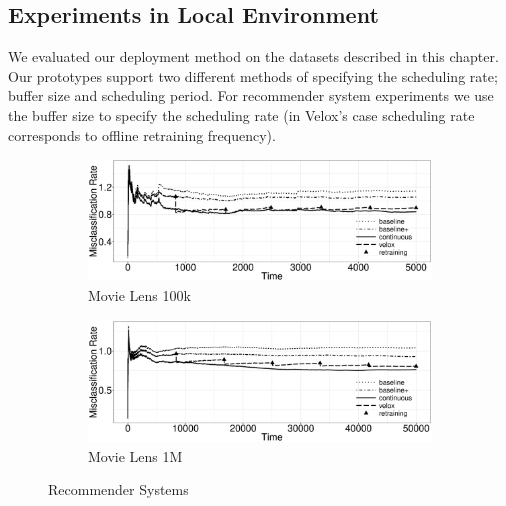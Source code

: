 \documentclass{vldb}
\begin{document}
\subsection{Experiments in Local Environment}
We evaluated our deployment method on the datasets described in this chapter.
Our prototypes support two different methods of specifying the scheduling rate; buffer size and scheduling period.
For recommender system experiments we use the buffer size to specify the scheduling rate (in Velox's case scheduling rate corresponds to offline retraining frequency).

\begin{figure}[h]
\begin{subfigure}{\columnwidth}
	\includegraphics[width=\columnwidth]{../images/experiment-results/movie-lens-100k-quality-improved.eps}
	\caption{Movie Lens 100k}
	\label{fig:movie-lens-100k-score}
\end{subfigure}
\begin{subfigure}{\columnwidth}
  \includegraphics[width=\columnwidth]{../images/experiment-results/movie-lens-1m-quality-improved.eps}
\caption{Movie Lens 1M}
\label{fig:movie-lens-1M-score}
\end{subfigure}
\caption{Recommender Systems}
\end{figure}
\end{document}
